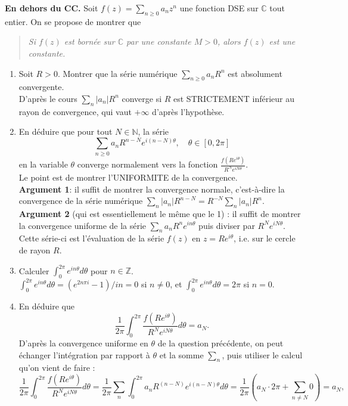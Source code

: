\documentclass[a4paper,10pt]{article}
\newcommand{\N}{\mathbb{N}}
\newcommand{\Z}{\mathbb{Z}}
\newcommand{\C}{\mathbb{C}}
\newcommand{\abs}[1]{\left|#1\right|}
\newcommand{\correction}[1]{{\color{red}#1}}
\newcommand{\comment}[1]{{\color{blue}#1}}
\begin{document}
\vspace{.1in}
\noindent
\textbf{En dehors du CC.}
Soit $f(z)=\sum_{n\geq0}a_nz^n$ une fonction DSE sur $\C$ tout entier. On se propose de montrer que 
\begin{quote}
    \textit{Si $f(z)$ est bornée sur $\C$ par une constante $M>0$, alors $f(z)$ est une constante.}
\end{quote}
\begin{enumerate}[label=\alph*)]
    \item Soit $R>0$. Montrer que la série numérique $\sum_{n\geq0} a_nR^n$ est absolument convergente. \\
    \correction{D'après le cours $\sum_n\abs{a_n}R^n$ converge si $R$ est STRICTEMENT inférieur au rayon de convergence, qui vaut $+\infty$ d'après l'hypothèse.}
    \item En déduire que pour tout $N\in\N$, la série
    $$\sum_{n\geq0}a_nR^{n-N}e^{i(n-N)\theta},\quad \theta\in[0,2\pi]$$
    en la variable $\theta$ converge normalement vers la fonction $\frac{f(Re^{i\theta})}{R^Ne^{iN\theta}}$. \\
    \correction{Le point est de montrer l'UNIFORMITE de la convergence.\\
    \textbf{Argument 1}: il suffit de montrer la convergence normale, c'est-à-dire la convergence de la série numérique $\sum_n \abs{a_n}R^{n-N}=R^{-N}\sum_n\abs{a_n}R^n$.} \\
    \comment{\textbf{Argument 2} (qui est essentiellement le même que le 1) : il suffit de montrer la convergence uniforme de la série $\sum_na_nR^ne^{in\theta}$ puis diviser par $R^Ne^{iN\theta}$. Cette série-ci est l'évaluation de la série $f(z)$ en $z=Re^{i\theta}$, i.e. sur le cercle de rayon $R$.}
    \item Calculer $\int_0^{2\pi}e^{in\theta}d\theta$ pour $n\in\Z$. \\
    \correction{$\int_0^{2\pi}e^{in\theta}d\theta=(e^{2n\pi i}-1)/in=0$ si $n\neq 0$, et $\int_0^{2\pi}e^{in\theta}d\theta=2\pi$ si $n=0$.}
    \item En déduire que 
    $$\frac{1}{2\pi}\int_0^{2\pi}\frac{f(Re^{i\theta})}{R^Ne^{iN\theta}}d\theta=a_N.$$
    \correction{D'après la convergence uniforme en $\theta$ de la question précédente, on peut échanger l'intégration par rapport à $\theta$ et la somme $\sum_n$, puis utiliser le calcul qu'on vient de faire :
    $$\frac{1}{2\pi}\int_0^{2\pi}\frac{f(Re^{i\theta})}{R^Ne^{iN\theta}}d\theta=\frac{1}{2\pi}\sum_n\int_0^{2\pi}a_nR^{(n-N)}e^{i(n-N)\theta}d\theta=\frac{1}{2\pi}(a_N\cdot2\pi+\sum_{n\neq N}0)=a_N,$$
}
\end{enumerate}
\end{document}
